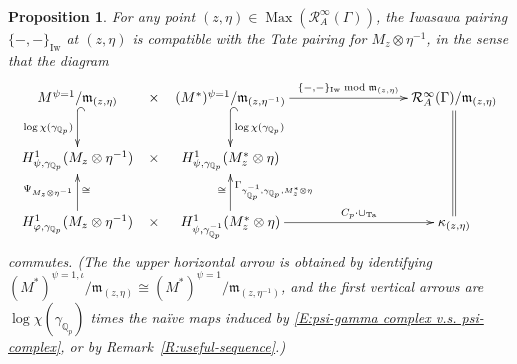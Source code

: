 \documentclass[12pt]{article}
\newtheorem{prop}[theorem]{Proposition}
\theoremstyle{definition}
\numberwithin{equation}{theorem}
\newcommand{\calR}{\mathcal{R}}
\newcommand{\gothm}{\mathfrak{m}}
\newcommand{\QQ}{\mathbb{Q}}
\newcommand{\Iw}{\mathrm{Iw}}
\def\Qp{\QQ_p}
\newcommand{\Ta}{\mathrm{Ta}}
\DeclareMathOperator{\Max}{Max}
\begin{document}
\begin{prop}
\label{P:Iwasawa pairing = Tate pairing}
For any point $(z,\eta) \in \Max(\calR_A^\infty(\Gamma))$, the Iwasawa
pairing $\{-,-\}_\Iw$ at $(z,\eta)$ is compatible with the Tate
pairing for $M_z \otimes \eta^{-1}$, in the sense that the diagram
\[
\xymatrix{
M^{\psi=1}/  \gothm_{(z,\eta)} \ar@{^(->}[d]_{\log\chi(\gamma_{\Qp})}
 \ar@{}[r]|{\displaystyle\times}
 & (M^*)^{\psi=1}/\gothm_{(z,\eta^{-1})} \ar@{^(->}[d]^{\log\chi(\gamma_{\Qp})} \ar[rrr]^-{\{-,-\}_\Iw \bmod \gothm_{(z,\eta)}}
 &&& \calR_{A}^\infty(\Gamma)/ \gothm_{(z,\eta)}\ar@{=}[dd] \\
H^1_{\psi,\gamma_{\Qp}}(M_z \otimes \eta^{-1})
 \ar@{}[r]|{\displaystyle\times}
 & H^1_{\psi,\gamma_{\Qp}}(M^*_z \otimes \eta) \\
H^1_{\varphi,\gamma_{\Qp}}(M_z \otimes \eta^{-1}) \ar[u]^{\Psi_{M_z \otimes \eta^{-1}}}_\cong
 \ar@{}[r]|{\displaystyle\times}
 & H^1_{\psi,\gamma_{\Qp}^{-1}}(M^*_z \otimes \eta) \ar[u]_{\Gamma_{\gamma_{\Qp}^{-1},\gamma_{\Qp},M_z^* \otimes \eta}}^\cong \ar[rrr]^-{C_p\cdot\cup_\Ta}
 &&& \kappa_{(z,\eta)}
}
\]
commutes.  (The the upper horizontal arrow is obtained by identifying
$(M^*)^{\psi=1,\iota}/\gothm_{(z,\eta)} \cong
(M^*)^{\psi=1}/\gothm_{(z,\eta^{-1})}$, and the first vertical arrows
are $\log\chi(\gamma_{\Qp})$ times the na\"ive maps induced by
\eqref{E:psi-gamma complex v.s. psi-complex}, or by
Remark~\ref{R:useful-sequence}.)
\end{prop}
\end{document}
